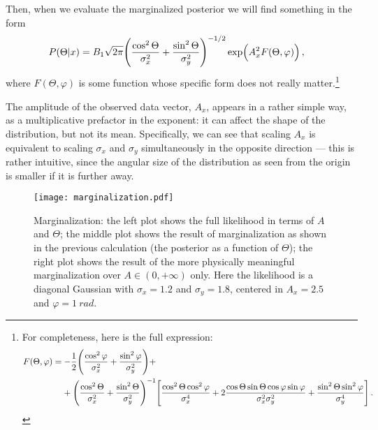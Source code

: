 \documentclass[main.tex]{subfiles}
\begin{document}
Then, when we  evaluate the marginalized posterior we will find something in the form
%
\begin{align}
P(\Theta | x) &= B_1 \sqrt{2 \pi } \qty( \frac{\cos^2\Theta }{\sigma_x^2} + \frac{\sin^2 \Theta }{\sigma _y^2})^{-1/2}
\exp( A_x^2 F(\Theta , \varphi ))
\,,
\end{align}
%
where \(F (\Theta , \varphi )\) is some function whose specific form does not really matter.\footnote{For completeness, here is the full expression: 
%
\begin{align}
\begin{split}
F(\Theta , \varphi ) &=
- \frac{1}{2} \qty( \frac{\cos^2\varphi}{\sigma^2_x} + \frac{\sin^2\varphi}{\sigma^2_y})+  \\
&\phantom{=}\ 
+\qty( \frac{\cos^2 \Theta}{\sigma _x^2} + \frac{\sin^2 \Theta }{\sigma _y^2})^{-1}
\qty[ 
    \frac{\cos^2 \Theta \cos^2 \varphi }{\sigma _x^{4}}
    +2\frac{\cos \Theta \sin \Theta \cos \varphi \sin \varphi  }{\sigma _x^{2} \sigma _y^{2}}
    +\frac{\sin^2 \Theta \sin^2 \varphi }{\sigma _y^{4}}
]
\,.
\end{split}
\end{align}
%
}

The amplitude of the observed data vector, \(A_x\), appears in a rather simple way, as a multiplicative prefactor in the exponent: it can affect the shape of the distribution, but not its mean.
Specifically, we can see that scaling \(A_x\) is equivalent to scaling \(\sigma _x\) and \(\sigma _y\) simultaneously in the opposite direction --- this is rather intuitive, since the angular size of the distribution as seen from the origin is smaller if it is further away. 


\begin{figure}[ht]
\centering
\texttt{[image: marginalization.pdf]}
\caption{Marginalization: the left plot shows the full likelihood in terms of \(A\) and \(\Theta \); the middle plot shows the result of marginalization as shown in the previous calculation (the posterior as a function of \(\Theta \)); the right plot shows the result of the more physically meaningful marginalization over \(A \in (0, + \infty )\) only.
Here the likelihood is a diagonal Gaussian with \(\sigma _x = \num{1.2}\) and \(\sigma _y = \num{1.8}\), centered in \(A_x = \num{2.5}\) and \(\varphi = \SI{1}{rad}\).}
\label{fig:marginalization}
\end{figure}
\end{document}
